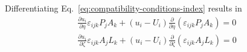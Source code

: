 Differentiating Eq.~\ref{eq:compatibility-conditions-index} results in
\[\begin{array}{l}
\frac{{\partial {u_i}}}{{\partial \eta }}{\varepsilon _{ijk}}{P_j}{A_k} + \left( {{u_i} - {U_i}} \right)\frac{\partial }{{\partial \eta }}\left( {{\varepsilon _{ijk}}{P_j}{A_k}} \right) = 0\\
\frac{{\partial {u_i}}}{{\partial \zeta }}{\varepsilon _{ijk}}{A_j}{L_k} + \left( {{u_i} - {U_i}} \right)\frac{\partial }{{\partial \zeta }}\left( {{\varepsilon _{ijk}}{A_j}{L_k}} \right) = 0
\end{array}\]

